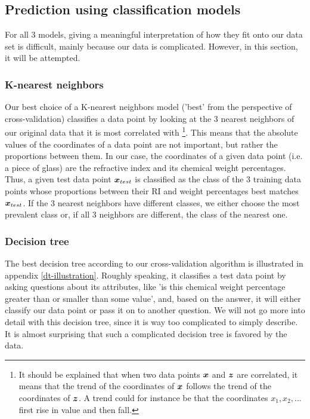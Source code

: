 \subsection{Prediction using classification models}

For all 3 models, giving a meaningful interpretation of how they fit onto our data set is difficult, mainly because our data is complicated. However, in this section, it will be attempted.


\subsubsection{K-nearest neighbors}

Our best choice of a K-nearest neighbors model ('best' from the perspective of cross-validation) classifies a data point by looking at the 3 nearest neighbors of our original data that it is most correlated with \footnote{It should be explained that when two data points $\bm{x}$ and $\bm{z}$ are correlated, it means that the trend of the coordinates of $\bm{x}$ follows the trend of the coordinates of $\bm{z}$. A trend could for instance be that the coordinates $x_1, x_2,...$ first rise in value and then fall.}. This means that the absolute values of the coordinates of a data point are not important, but rather the proportions between them. In our case, the coordinates of a given data point (i.e. a piece of glass) are the refractive index and its chemical weight percentages. Thus, a given test data point $\bm{x}_{test}$ is classified as the class of the 3 training data points whose proportions between their RI and weight percentages best matches $\bm{x}_{test}$. If the 3 nearest neighbors have different classes, we either choose the most prevalent class or, if all 3 neighbors are different, the class of the nearest one.

\subsubsection{Decision tree}
The best decision tree according to our cross-validation algorithm is illustrated in appendix \ref{dt-illustration}. Roughly speaking, it classifies a test data point by asking questions about its attributes, like 'is this chemical weight percentage greater than or smaller than some value', and, based on the answer, it will either classify our data point or pass it on to another question. We will not go more into detail with this decision tree, since it is way too complicated to simply describe. It is almost surprising that such a complicated decision tree is favored by the data.

